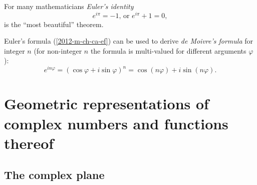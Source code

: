 For many mathematicians
{\em Euler's identity}
\begin{equation}
e^{i\pi}=-1 \textrm{, or } e^{i\pi}+1=0,
\end{equation}
is the ``most beautiful'' theorem.\cite{springerlink:10.1007/BF03023741}

Euler's formula (\ref{2012-m-ch-ca-ef}) can be used to derive {\em de Moivre's formula}
 for integer $n$ (for non-integer $n$ the formula is multi-valued for different arguments $\varphi$):
\begin{equation}
e^{in\varphi} = (\cos \varphi +i \sin \varphi )^n      = \cos (n\varphi) +i \sin (n\varphi).
\end{equation}






\section{Geometric representations of complex numbers and functions thereof}

\subsection{The complex plane}

